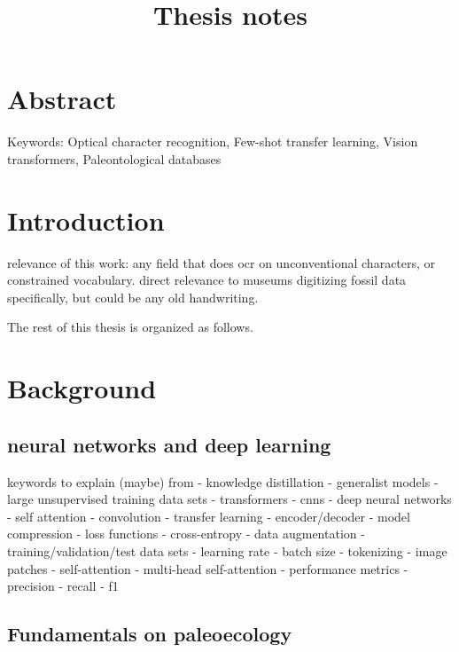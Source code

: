 \documentclass{article}
\title{Thesis notes}
\begin{document}
\tableofcontents

\section{Abstract}

Keywords: Optical character recognition, Few-shot transfer learning, Vision transformers, Paleontological databases

\section{Introduction}


relevance of this work: any field that does ocr on unconventional characters, or constrained vocabulary.
direct relevance to museums digitizing fossil data specifically, but could be any old handwriting.

The rest of this thesis is organized as follows.

\section{Background}


\subsection{neural networks and deep learning}
keywords to explain (maybe) from \cite{li2021trocr}
- knowledge distillation
- generalist models
	- large unsupervised training data sets
- transformers
- cnns
- deep neural networks
- self attention
- convolution
- transfer learning
- encoder/decoder
- model compression
- loss functions
	- cross-entropy 
- data augmentation
- training/validation/test data sets
- learning rate
- batch size
- tokenizing
- image patches
- self-attention
- multi-head self-attention
- performance metrics
	- precision
	- recall 
	- f1

\subsection{Fundamentals on paleoecology}
\end{document}
